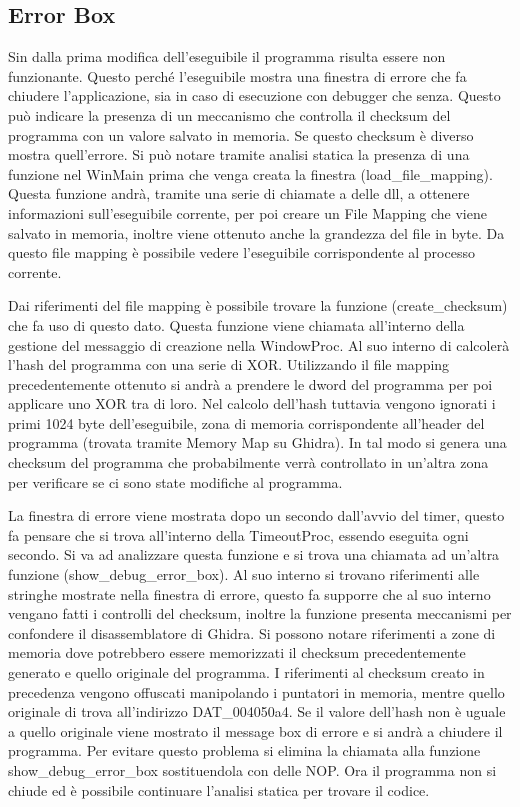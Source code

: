 \documentclass[a4paper,12pt]{article}
\begin{document}
\subsection{Error Box}
Sin dalla prima modifica dell'eseguibile il programma risulta essere non funzionante. Questo perché l'eseguibile mostra una finestra di errore che fa chiudere l'applicazione, sia in caso di esecuzione con debugger che senza.  Questo può indicare la presenza di un meccanismo che controlla il checksum del programma con un valore salvato in memoria. Se questo checksum è diverso mostra quell'errore. Si può notare tramite analisi statica la presenza di una funzione nel WinMain prima che venga creata la finestra (load\_file\_mapping). Questa funzione andrà, tramite una serie di chiamate a delle dll, a ottenere informazioni sull'eseguibile corrente, per poi creare un File Mapping che viene salvato in memoria, inoltre viene ottenuto anche la grandezza del file in byte. Da questo file mapping è possibile vedere l'eseguibile corrispondente al processo corrente.

Dai riferimenti del file mapping è possibile trovare la funzione (create\_checksum) che fa uso di questo dato. Questa funzione viene chiamata all'interno della gestione del messaggio di creazione nella WindowProc. 
Al suo interno di calcolerà l'hash del programma con una serie di XOR. Utilizzando il file mapping precedentemente ottenuto si andrà a prendere le dword del programma per poi applicare uno XOR tra di loro.  Nel calcolo dell'hash tuttavia vengono ignorati i primi 1024 byte dell'eseguibile, zona di memoria corrispondente all'header del programma (trovata tramite Memory Map su Ghidra).
In tal modo si genera una checksum del programma che probabilmente verrà controllato in un'altra zona per verificare se ci sono state modifiche al programma.  

La finestra di errore viene mostrata dopo un secondo dall'avvio del timer, questo fa pensare che si trova all'interno della TimeoutProc, essendo eseguita ogni secondo. Si va ad analizzare questa funzione e si trova una chiamata ad un'altra funzione (show\_debug\_error\_box). Al suo interno si trovano riferimenti alle stringhe mostrate nella finestra di errore, questo fa supporre che al suo interno vengano fatti i controlli del checksum, inoltre la funzione presenta meccanismi per confondere il disassemblatore di Ghidra. 
Si possono notare riferimenti a zone di memoria  dove potrebbero essere memorizzati il checksum precedentemente generato e quello originale del programma. I riferimenti al checksum creato in precedenza vengono offuscati  manipolando i puntatori in memoria, mentre quello originale di trova all'indirizzo DAT\_004050a4. Se il valore dell'hash non è uguale a quello originale viene mostrato il message box di errore e si andrà a chiudere il programma. Per evitare questo problema si elimina la chiamata alla funzione show\_debug\_error\_box sostituendola con delle NOP. Ora il programma non si chiude ed è possibile continuare l'analisi statica per trovare il codice.
\end{document}
